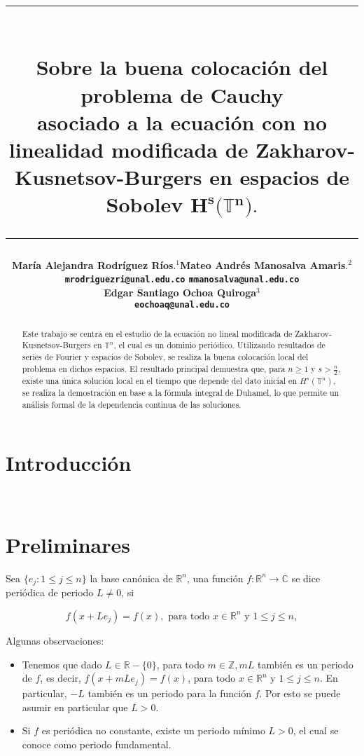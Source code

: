 \documentclass[12pt]{article}
\title{\vspace{-2cm}\par\noindent\rule{16cm}{1pt}\large
\\\bfseries Sobre la buena colocación del problema de Cauchy \\
asociado a la ecuación con no linealidad modificada de Zakharov-Kusnetsov-Burgers en espacios de Sobolev $\mathbf{H^s}\pmb{(}\pmb{\mathbb{T}}\mathbf{^n}\pmb{)}.$
\vspace{-0.34cm}\par\noindent\hspace{0.15cm}\rule{16cm}{1pt}
\vspace{-0.6cm}
}
\author{\small \bfseries María Alejandra Rodríguez Ríos$.^1$\quad \quad\small Mateo Andrés Manosalva Amaris$.^{2}$\\ \small \quad \texttt{mrodriguezri@unal.edu.co} \quad \quad \quad \quad \quad \quad \texttt{mmanosalva@unal.edu.co}\quad\quad \quad\\ \small \bfseries Edgar Santiago Ochoa Quiroga$^{3}$\\
\small \texttt{eochoaq@unal.edu.co}
}
\newcommand\R{\ensuremath{\mathbb{R}}}
\newcommand\T{\mathbb{T}}
\begin{document}
\maketitle
\begin{abstract}
Este trabajo se centra en el estudio de la ecuación no lineal modificada de Zakharov-Kusnetsov-Burgers en $\T^n$, el cual es un dominio periódico. Utilizando resultados de series de Fourier y espacios de Sobolev, se realiza la buena colocación local del problema en dichos espacios. El resultado principal demuestra que, para $n \geq 1$ y $s > \frac{n}{2}$, existe una única solución local en el tiempo que depende del dato inicial en $H^s(\mathbb{T}^n)$, se realiza la demostración en base a la fórmula integral de Duhamel, lo que permite un análisis formal de la dependencia continua de las soluciones.
\end{abstract}

\section{Introducción}
\lipsum[2]\\
\lipsum[1]
\section{Preliminares}

\begin{definition}
 Sea $\{e_j:  1\leq j\leq n\}$ la base canónica de $\R^n$, una función $f: \mathbb{R}^n \rightarrow \mathbb{C}$ se dice periódica de periodo $L \neq 0$, si

$$
f(x+L e_j)=f(x), \text { para todo } x \in \mathbb{R}^n \text{ y } 1\leq j\leq n, 
$$


\end{definition}

Algunas observaciones:
\begin{itemize}
    \item  Tenemos que dado $L\in \R-\{0\}$, para todo $m \in \mathbb{Z}, m L$ también es un periodo de $f$, es  decir, $f(x+m L e_j)=f(x)$, para todo $x \in \mathbb{R}^n $ y $1\leq j\leq n$. En particular, $-L$ también es un periodo para la función $f$. Por esto se puede asumir en particular que $L>0$.
    
    \item Si $f$ es periódica no constante, existe un periodo mínimo $L>0$, el cual se conoce como periodo fundamental.
\end{itemize}
\end{document}
